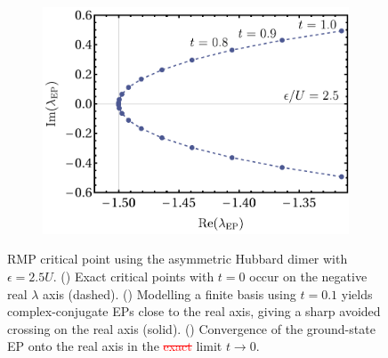 \documentclass[aps,prb,reprint,noshowkeys,superscriptaddress]{revtex4-1}
\newcommand{\trash}[1]{\textcolor{red}{\sout{#1}}}
\begin{document}
\begin{figure}[t]
\begin{subfigure}{0.32\textwidth}
		\subcaption{\label{subfig:rmp_cp_surf}}
    \end{subfigure}
    \begin{subfigure}{0.32\textwidth}
    \includegraphics[height=0.75\textwidth]{fig7c}
		\subcaption{\label{subfig:rmp_ep_to_cp}}
    \end{subfigure}
	\caption{%
		RMP critical point using the asymmetric Hubbard dimer with $\epsilon = 2.5 U$.
		() Exact critical points with $t=0$ occur on the negative real $\lambda$ axis (dashed).
		() Modelling a finite basis using $t=0.1$ yields complex-conjugate EPs close to the
		real axis, giving a sharp avoided crossing on the real axis (solid).
		() Convergence of the ground-state EP onto the real axis in the \trash{exact} limit $t \to 0$.
	\label{fig:RMP_cp}}
\end{figure}
\end{document}
